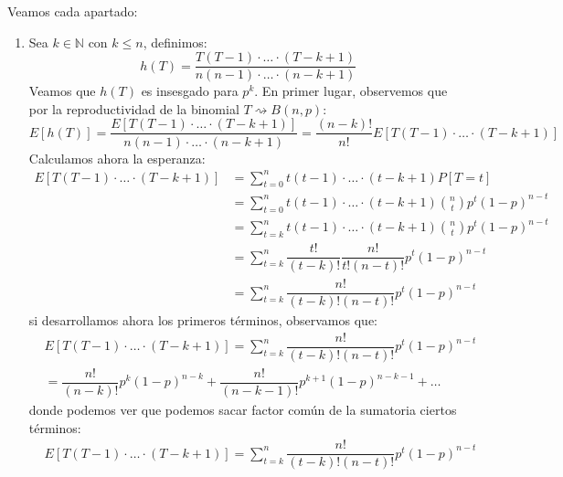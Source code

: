 \begin{ejercicio}
    Veamos cada apartado:
    \begin{enumerate}[label=\alph*)]
        \item Sea $k\in \mathbb{N}$ con $k\leq n$, definimos:
            \begin{equation*}
                h(T) = \dfrac{T(T-1)\cdot \ldots\cdot (T-k+1)}{n(n-1)\cdot \ldots\cdot (n-k+1)}
            \end{equation*}
            Veamos que $h(T)$ es insesgado para $p^k$. En primer lugar, observemos que por la reproductividad de la binomial $T\rightsquigarrow B(n,p)$:
            \begin{equation*}
                E[h(T)] = \dfrac{E[T(T-1)\cdot \ldots\cdot (T-k+1)]}{n(n-1)\cdot \ldots\cdot (n-k+1)} = \dfrac{(n-k)!}{n!}E[T(T-1)\cdot \ldots\cdot (T-k+1)]
            \end{equation*}
            Calculamos ahora la esperanza:
            \begin{align*}
                E[T(T-1)\cdot \ldots\cdot (T-k+1)] &= \sum_{t=0}^{n}t(t-1)\cdot \ldots\cdot (t-k+1)P[T=t] \\ 
                                                   &= \sum_{t=0}^{n}t(t-1)\cdot \ldots\cdot (t-k+1)\binom{n}{t}p^t{(1-p)}^{n-t} \\
                                                   &= \sum_{t=k}^{n}t(t-1)\cdot \ldots\cdot(t-k+1) \binom{n}{t}p^t {(1-p)}^{n-t} \\
                                                   &= \sum_{t=k}^{n}\dfrac{t!}{(t-k)!}\dfrac{n!}{t!(n-t)!}p^t {(1-p)}^{n-t} \\
                                                   &= \sum_{t=k}^{n}\dfrac{n!}{(t-k)!(n-t)!}p^t {(1-p)}^{n-t}
            \end{align*}
            si desarrollamos ahora los primeros términos, observamos que:
            \begin{align*}
                &E[T(T-1)\cdot \ldots\cdot (T-k+1)] = \sum_{t=k}^{n}\dfrac{n!}{(t-k)!(n-t)!}p^t {(1-p)}^{n-t} \\
               &= \dfrac{n!}{(n-k)!}p^k {(1-p)}^{n-k} + \dfrac{n!}{(n-k-1)!}p^{k+1}{(1-p)}^{n-k-1} + \ldots
            \end{align*}
            donde podemos ver que podemos sacar factor común de la sumatoria ciertos términos:
            \begin{align*}
                &E[T(T-1)\cdot \ldots\cdot (T-k+1)] = \sum_{t=k}^{n}\dfrac{n!}{(t-k)!(n-t)!}p^t {(1-p)}^{n-t} \\

\end{align*}
\end{enumerate}
\end{ejercicio}
